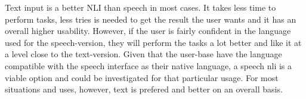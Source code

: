 Text input is a better NLI than speech in most cases. It takes less time to perform tasks, less tries is needed to get the result the user wants and it has an overall higher usability. However, if the user is fairly confident in the language used for the speech-version, they will perform the tasks a lot better and like it at a level close to the text-version. Given that the user-base have the language compatible with the speech interface as their native language, a speech nli is a viable option and could be investigated for that particular usage. For most situations and uses, however, text is prefered and better on an overall basis.